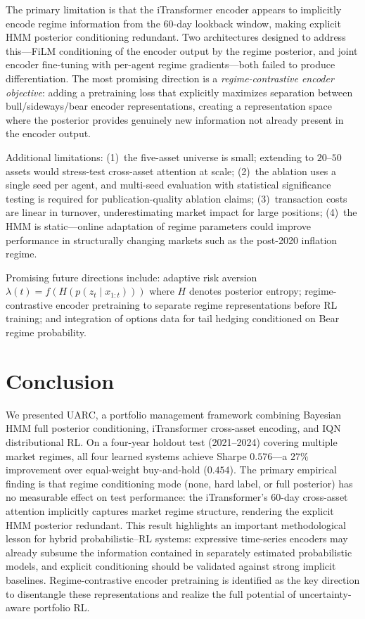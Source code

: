 \documentclass[sigconf,nonacm]{acmart}
\newcommand{\post}{p(z_t \mid x_{1:t})}
\begin{document}
The primary limitation is that the iTransformer encoder appears to implicitly
encode regime information from the 60-day lookback window, making explicit
HMM posterior conditioning redundant.
Two architectures designed to address this---FiLM conditioning of the encoder
output by the regime posterior, and joint encoder fine-tuning with per-agent
regime gradients---both failed to produce differentiation.
The most promising direction is a \emph{regime-contrastive encoder objective}:
adding a pretraining loss that explicitly maximizes separation between
bull/sideways/bear encoder representations, creating a representation space
where the posterior provides genuinely new information not already present
in the encoder output.

Additional limitations: (1)~the five-asset universe is small; extending to
$20$--$50$ assets would stress-test cross-asset attention at scale;
(2)~the ablation uses a single seed per agent, and multi-seed evaluation
with statistical significance testing is required for publication-quality
ablation claims; (3)~transaction costs are linear in turnover, underestimating
market impact for large positions; (4)~the HMM is static---online adaptation
of regime parameters could improve performance in structurally changing
markets such as the post-2020 inflation regime.

Promising future directions include: adaptive risk aversion
$\lambda(t) = f(H(\post))$ where $H$ denotes posterior entropy;
regime-contrastive encoder pretraining to separate regime representations
before RL training; and integration of options data for tail hedging
conditioned on Bear regime probability.

\section{Conclusion}
\label{sec:conclusion}

We presented \textsc{UARC}, a portfolio management framework combining Bayesian
HMM full posterior conditioning, iTransformer cross-asset encoding, and IQN
distributional RL.
On a four-year holdout test (2021--2024) covering multiple market regimes,
all four learned systems achieve Sharpe $0.576$---a $27\%$ improvement over
equal-weight buy-and-hold ($0.454$).
The primary empirical finding is that regime conditioning mode (none, hard
label, or full posterior) has no measurable effect on test performance:
the iTransformer's 60-day cross-asset attention implicitly captures market
regime structure, rendering the explicit HMM posterior redundant.
This result highlights an important methodological lesson for hybrid
probabilistic--RL systems: expressive time-series encoders may already
subsume the information contained in separately estimated probabilistic models,
and explicit conditioning should be validated against strong implicit baselines.
Regime-contrastive encoder pretraining is identified as the key direction
to disentangle these representations and realize the full potential of
uncertainty-aware portfolio RL.



\end{document}
